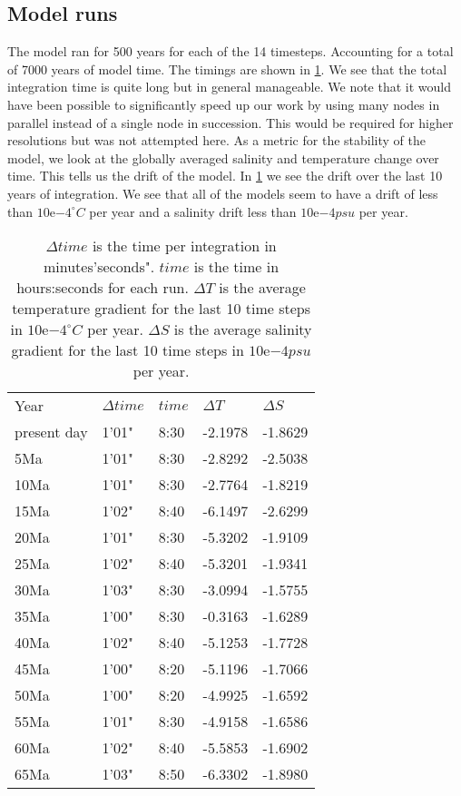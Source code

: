 \subsection{Model runs}
The model ran for 500 years for each of the 14 timesteps. Accounting for a total of 7000 years of model time. The timings are shown in \cref{table:mastepstable}. We see that the total integration time is quite long but in general manageable. We note that it would have been possible to significantly speed up our work by using many nodes in parallel instead of a single node in succession. This would be required for higher resolutions but was not attempted here.
As a metric for the stability of the model, we look at the globally averaged salinity and temperature change over time. This tells us the drift of the model. In \cref{table:mastepstable} we see the drift over the last 10 years of integration. We see that all of the models seem to have a drift of less than $10\mathrm{e}{-4}^{\circ}C$ per year and a salinity drift less than $10\mathrm{e}{-4} psu$ per year.

\begin{table}[H]
	\centering
	\begin{tabular}{lllll}
Year & $\Delta time$ & $time$ & $\Delta T$& $\Delta S$\\
present day & 1'01" & 8:30& -2.1978& -1.8629\\
5Ma& 1'01" & 8:30& -2.8292& -2.5038 \\
10Ma & 1'01" & 8:30& -2.7764& -1.8219\\
15Ma & 1'02" & 8:40& -6.1497& -2.6299\\
20Ma & 1'01" & 8:30&  -5.3202& -1.9109\\
25Ma & 1'02" & 8:40& -5.3201& -1.9341\\
30Ma & 1'03" & 8:30& -3.0994& -1.5755\\
35Ma & 1'00" & 8:30& -0.3163&-1.6289\\
40Ma & 1'02" & 8:40& -5.1253& -1.7728\\
45Ma & 1'00" & 8:20& -5.1196& -1.7066\\
50Ma & 1'00" & 8:20& -4.9925& -1.6592\\
55Ma & 1'01" & 8:30& -4.9158& -1.6586\\
60Ma & 1'02" & 8:40& -5.5853& -1.6902\\
65Ma & 1'03" & 8:50& -6.3302& -1.8980\\
	\end{tabular}

\caption{$\Delta time$ is the time per integration in minutes'seconds". $time$ is the time in hours:seconds for each run. $\Delta T$ is the average temperature gradient for the last 10 time steps in $10\mathrm{e}{-4}^{\circ}C$ per year. $\Delta S$ is the average salinity gradient for the last 10 time steps in $10\mathrm{e}{-4} psu$ per year.}
\label{table:mastepstable}
\end{table}


